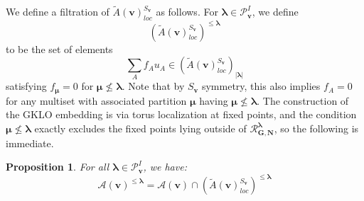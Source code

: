 \documentclass[11pt,reqno]{amsart}
\renewcommand{\mathbf}{\mathbold}
\numberwithin{equation}{section}
\newtheorem{Proposition}[equation]{Proposition}
\theoremstyle{definition}
\newcommand{\cA}{\mathcal{A}}
\newcommand{\bG}{\mathbf{G}}
\newcommand{\bN}{\mathbf{N}}
\newcommand{\cP}{\mathcal{P}}
\newcommand{\cR}{\mathcal{R}}
\newcommand{\bv}{\mathbf{v}}
\renewcommand{\tilde}[1]{\widetilde{#1}}
\renewcommand{\bv}{\mathbf{v}} %
\newcommand{\vertexset}{I}
\newcommand{\Partitions}{\cP}
\newcommand{\bla}{{\boldsymbol{\lambda}}}
\newcommand{\bmu}{{\boldsymbol{\mu}}}
\newcommand{\qzast}{\cA}
\newcommand{\GKLO}[1]{\tilde{A}(#1)_{loc}}
\begin{document}
We define a filtration of $\GKLO{\bv}^{S_{\bv}}$ as follows. For $\bla \in \Partitions^\vertexset_{\bv}$, we define
\begin{equation}
   \left(\GKLO{\bv}^{S_{\bv}}\right)^{\leq \bla}
\end{equation}
to be the set of elements 
\begin{equation}
    \sum_{A} f_A u_A \in \left(\GKLO{\bv}^{S_{\bv}}\right)_{|\bla|}
\end{equation}
satisfying $f_{\bmu} = 0$ for $\bmu \nleq \bla$. Note that by $S_{\bv}$ symmetry, this also implies $f_A = 0$ for any multiset with associated partition $\bmu$ having $\bmu \nleq \bla$. The construction of the GKLO embedding is via torus localization at fixed points, and the condition $\bmu \nleq \bla$ exactly excludes the fixed points lying outside of $\cR^\bla_{\bG,\bN}$, so the following is immediate.
\begin{Proposition}
For all $\bla \in \cP^\vertexset_{\bv}$, we have:
\begin{equation}
    \qzast(\bv)^{\leq \bla} = \qzast(\bv) \cap  \left(\GKLO{\bv}^{S_{\bv}}\right)^{\leq \bla}
\end{equation}
\end{Proposition}
\end{document}
